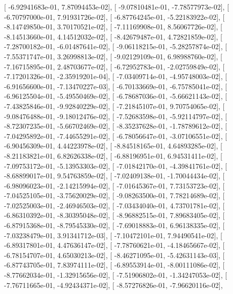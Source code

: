 \documentclass{article}
\begin{document}
       [ -6.92941683e-01,   7.87094453e-02],
       [ -9.07810481e-01,  -7.78577973e-02],
       [ -6.70797000e-01,   7.91931726e-02],
       [ -6.87764245e-01,  -5.22183922e-02],
       [ -8.14749850e-01,   3.70170521e-02],
       [ -7.11169908e-01,   8.56067726e-02],
       [ -8.14513660e-01,   4.14512032e-02],
       [ -8.42679487e-01,   4.72821859e-02],
       [ -7.28700182e-01,  -6.01487641e-02],
       [ -9.06118215e-01,  -5.28257874e-02],
       [ -7.55371747e-01,   3.26998813e-02],
       [ -9.02129109e-01,   6.98988760e-02],
       [ -7.16715895e-01,   2.48703677e-02],
       [ -6.72952783e-01,  -2.02759849e-02],
       [ -7.17201326e-01,  -2.35919201e-04],
       [ -7.03409714e-01,  -4.95748003e-02],
       [ -6.91656600e-01,  -7.13470227e-03],
       [ -6.70133669e-01,  -6.75785041e-02],
       [ -6.96125504e-01,  -5.49550469e-02],
       [ -6.78687036e-01,  -5.66621143e-02],
       [ -7.43825846e-01,  -9.92840229e-02],
       [ -7.21845107e-01,   9.70754065e-02],
       [ -9.08476488e-01,  -9.18012476e-02],
       [ -7.52683598e-01,  -5.92114797e-02],
       [ -8.72307235e-01,  -5.66702469e-02],
       [ -8.35237628e-01,  -1.78789612e-02],
       [ -7.04295892e-01,  -7.44655291e-02],
       [ -6.78056647e-01,  -3.07106551e-02],
       [ -6.90456309e-01,   4.44223978e-02],
       [ -8.84518165e-01,   4.64893285e-02],
       [ -8.21183821e-01,   6.82626338e-02],
       [ -6.88196951e-01,   6.94531411e-02],
       [ -7.09753172e-01,  -5.13953303e-02],
       [ -7.01842170e-01,  -4.39841761e-02],
       [ -8.68899017e-01,   9.54763859e-02],
       [ -7.02409138e-01,  -1.70044434e-02],
       [ -6.98096023e-01,  -2.14215994e-02],
       [ -7.01645367e-01,   7.73153723e-02],
       [ -7.04525105e-01,  -3.75620029e-02],
       [ -9.08263500e-01,   7.78214689e-02],
       [ -7.02525003e-01,  -2.46946503e-02],
       [ -7.03434040e-01,   4.73701781e-02],
       [ -6.86310392e-01,  -8.30395048e-02],
       [ -8.96882515e-01,   7.89683405e-02],
       [ -6.87915368e-01,  -8.79545330e-02],
       [ -7.69018883e-01,   6.96138335e-02],
       [ -7.03238479e-01,   3.91341712e-03],
       [ -7.10472101e-01,   7.94490541e-02],
       [ -6.89317801e-01,   4.47636147e-02],
       [ -7.78760621e-01,  -4.18465667e-02],
       [ -6.78154707e-01,   4.65030213e-02],
       [ -8.46271095e-01,  -5.42631143e-03],
       [ -6.87743705e-01,   7.83974111e-02],
       [ -6.89553914e-01,  -8.00111086e-02],
       [ -8.77662034e-01,  -1.32915656e-02],
       [ -7.51906802e-01,  -1.34247053e-02],
       [ -7.76711665e-01,  -4.92434371e-02],
       [ -8.57276826e-01,  -7.96620116e-02],
\end{document}
